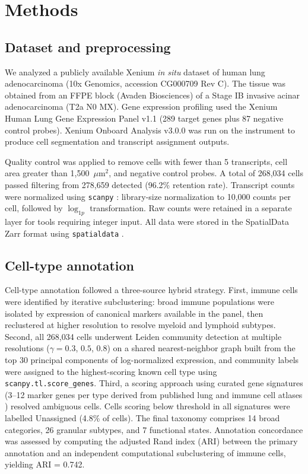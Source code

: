 \documentclass[12pt,a4paper]{article}
\begin{document}
\section*{Methods}
\label{sec:methods}

\subsection*{Dataset and preprocessing}
We analyzed a publicly available Xenium \textit{in situ} dataset of human lung adenocarcinoma (10x Genomics, accession CG000709 Rev C). The tissue was obtained from an FFPE block (Avaden Biosciences) of a Stage IB invasive acinar adenocarcinoma (T2a N0 MX). Gene expression profiling used the Xenium Human Lung Gene Expression Panel v1.1 (289 target genes plus 87 negative control probes). Xenium Onboard Analysis v3.0.0 was run on the instrument to produce cell segmentation and transcript assignment outputs.

Quality control was applied to remove cells with fewer than 5 transcripts, cell area greater than 1,500~$\mu$m$^{2}$, and negative control probes. A total of 268,034 cells passed filtering from 278,659 detected (96.2\% retention rate). Transcript counts were normalized using \texttt{scanpy} \citep{wolf2018scanpy}: library-size normalization to 10,000 counts per cell, followed by $\log_{1p}$ transformation. Raw counts were retained in a separate layer for tools requiring integer input. All data were stored in the SpatialData Zarr format using \texttt{spatialdata} \citep{marconato2024spatialdata}.

\subsection*{Cell-type annotation}
Cell-type annotation followed a three-source hybrid strategy. First, immune cells were identified by iterative subclustering: broad immune populations were isolated by expression of canonical markers available in the panel, then reclustered at higher resolution to resolve myeloid and lymphoid subtypes. Second, all 268,034 cells underwent Leiden community detection at multiple resolutions ($\gamma = 0.3$, $0.5$, $0.8$) on a shared nearest-neighbor graph built from the top 30 principal components of log-normalized expression, and community labels were assigned to the highest-scoring known cell type using \texttt{scanpy.tl.score\_genes}. Third, a scoring approach using curated gene signatures (3--12 marker genes per type derived from published lung and immune cell atlases \citep{travaglini2020molecular}) resolved ambiguous cells. Cells scoring below threshold in all signatures were labelled Unassigned (4.8\% of cells). The final taxonomy comprises 14 broad categories, 26 granular subtypes, and 7 functional states. Annotation concordance was assessed by computing the adjusted Rand index (ARI) between the primary annotation and an independent computational subclustering of immune cells, yielding ARI = 0.742.
\end{document}
